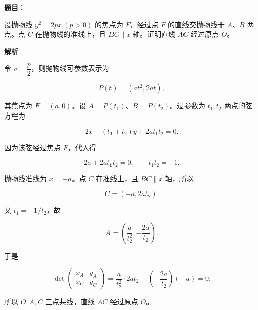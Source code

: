 \begin{answer}

\textbf{题目}：

设抛物线 $y^2=2px\ (p>0)$ 的焦点为 $F$，经过点 $F$ 的直线交抛物线于 $A$、$B$ 两点。点 $C$ 在抛物线的准线上，且 $BC\parallel x$ 轴。证明直线 $AC$ 经过原点 $O$。

\textbf{解析}

令 $a=\dfrac p2$，则抛物线可参数表示为

\nopagebreak[4]
\[
P(t)=(at^2,2at),
\]

其焦点为 $F=(a,0)$。设 $A=P(t_1)$、$B=P(t_2)$。过参数为 $t_1,t_2$ 两点的弦方程为

\nopagebreak[4]
\[
2x-(t_1+t_2)y+2at_1t_2=0.
\]

因为该弦经过焦点 $F$，代入得

\nopagebreak[4]
\[
2a+2at_1t_2=0,\qquad t_1t_2=-1.
\]

抛物线准线为 $x=-a$。点 $C$ 在准线上，且 $BC\parallel x$ 轴，所以

\nopagebreak[4]
\[
C=(-a,2at_2).
\]

又 $t_1=-1/t_2$，故

\nopagebreak[4]
\[
A=\left(\frac a{t_2^2},-\frac{2a}{t_2}\right).
\]

于是

\nopagebreak[4]
\[
\det\begin{pmatrix}
x_A & y_A\\
x_C & y_C
\end{pmatrix}
=\frac a{t_2^2}\cdot2at_2
-\left(-\frac{2a}{t_2}\right)(-a)=0.
\]

所以 $O,A,C$ 三点共线，直线 $AC$ 经过原点 $O$。


\end{answer}
